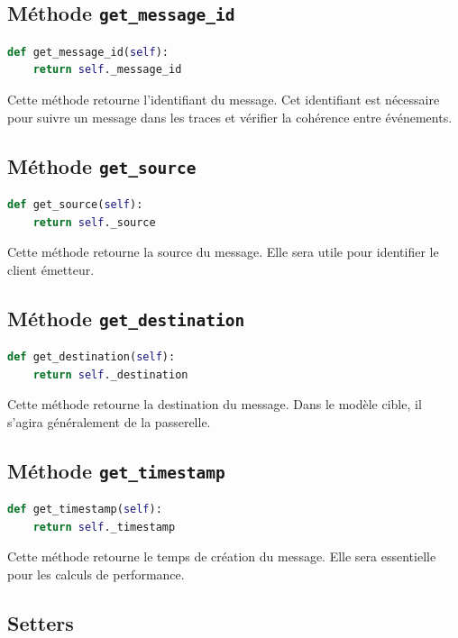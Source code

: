 \documentclass{article}
\begin{document}
\subsection{Méthode \texttt{get\_message\_id}}

\begin{lstlisting}[language=Python]
def get_message_id(self):
    return self._message_id
\end{lstlisting}

Cette méthode retourne l’identifiant du message. Cet identifiant est nécessaire pour suivre un message dans les traces et vérifier la cohérence entre événements.

\subsection{Méthode \texttt{get\_source}}

\begin{lstlisting}[language=Python]
def get_source(self):
    return self._source
\end{lstlisting}

Cette méthode retourne la source du message. Elle sera utile pour identifier le client émetteur.

\subsection{Méthode \texttt{get\_destination}}

\begin{lstlisting}[language=Python]
def get_destination(self):
    return self._destination
\end{lstlisting}

Cette méthode retourne la destination du message. Dans le modèle cible, il s’agira généralement de la passerelle.

\subsection{Méthode \texttt{get\_timestamp}}

\begin{lstlisting}[language=Python]
def get_timestamp(self):
    return self._timestamp
\end{lstlisting}

Cette méthode retourne le temps de création du message. Elle sera essentielle pour les calculs de performance.

\subsection{Setters}
\end{document}
